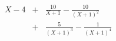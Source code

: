 \begin{eqnarray*} X-4 &+&\frac{10}{X+1} - \frac{10}{(X+1)^2}\\ &+& \frac{5}{(X+1)^3} -\frac{1}{(X+1)^4}
\end{eqnarray*}